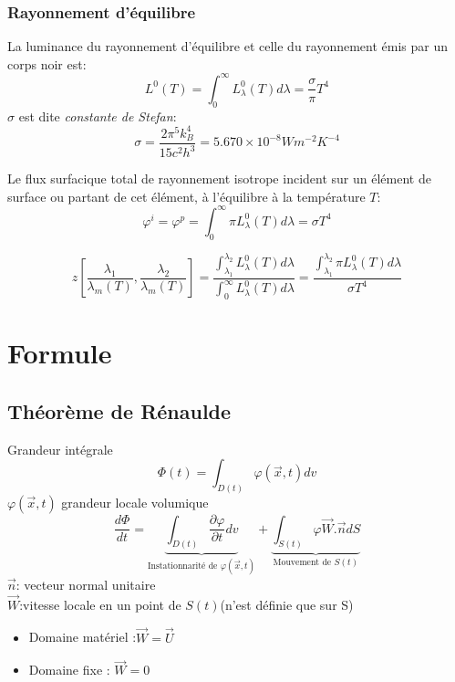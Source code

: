 \documentclass[openany]{book}
\begin{document}
\subsubsection{Rayonnement d'\'equilibre}
La luminance du rayonnement d'\'equilibre et celle du rayonnement \'emis par un corps noir est:
$$L^0(T)=\int_{0}^{\infty}L_{\lambda}^0(T)d \lambda =\frac{\sigma}{\pi}T^4$$
$\sigma$ est dite \textit{constante de Stefan}:
$$\sigma=\frac{ 2\pi^5 k_B^4}{15c^2 h^3}=5.670\times 10^{-8} Wm^{-2}K^{-4}$$

Le flux surfacique total de rayonnement isotrope incident sur un \'el\'ement de surface ou partant de cet \'el\'ement, \`a l'\'equilibre \`a la temp\'erature $T$:
$$\varphi^i=\varphi^p=\int_{0}^{\infty}\pi L_{\lambda}^0(T)d \lambda =\sigma T^4$$

$$
z[ \frac{ \lambda _1}{\lambda _m(T)}, \frac{ \lambda _2}{\lambda _m(T)}]
=
\frac{ \int_{\lambda _1}^{\lambda _2} L_{\lambda}^0(T)d \lambda }{\int_{0}^{\infty}L_{\lambda}^0(T)d \lambda }
=
\frac{ \int_{\lambda _1}^{\lambda _2}\pi L_{\lambda}^0(T)d \lambda }{\sigma T^4}
$$

\section{Formule}
\subsection{Th\'eor\`eme de R\'enaulde}
Grandeur int\'egrale
$$
\Phi(t)=\int_{D(t)} \varphi(\vec{x},t)dv
$$
$\varphi(\vec{x},t)$ grandeur locale volumique
$$
\frac{ d\Phi}{dt}=
\underbrace{\int_{D(t)}\frac{\partial \varphi}{\partial t}dv}_{\text{Instationnarit\'e de } \varphi(\vec{x},t)}
+
\underbrace{\int_{S(t)} \varphi \vec{W}.\vec{n}dS}_{\text{Mouvement de }S(t)}
$$
$\vec{n}$: vecteur normal unitaire\\
$\vec{W}$:vitesse locale en un point de $S(t)$(n'est définie que sur S)\\
\begin{itemize}
\item  Domaine mat\'eriel :$\vec{W}=\vec{ U}$
\item  Domaine fixe : $\vec{W}=0$
\end{itemize}
\end{document}
